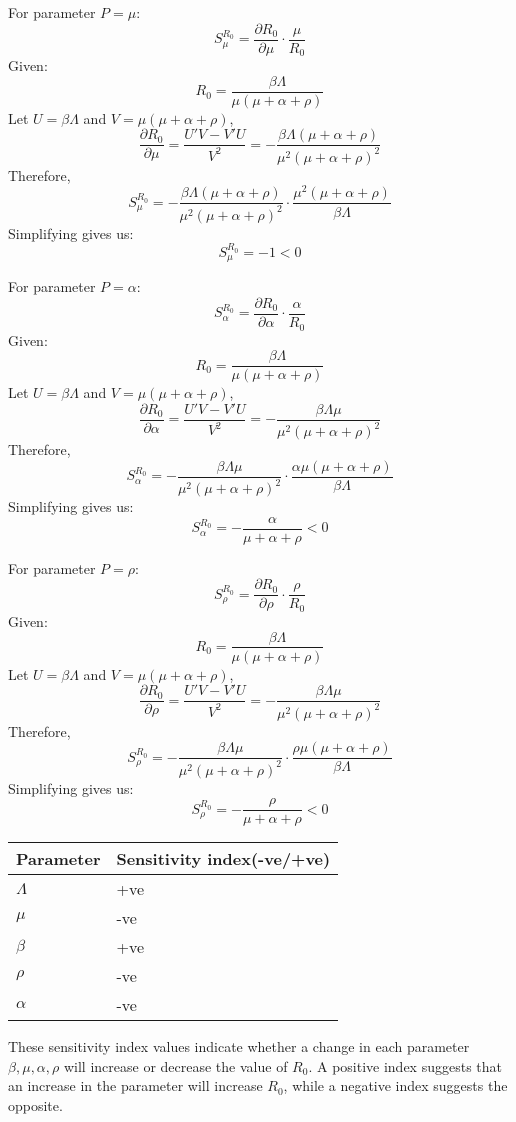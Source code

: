 \documentclass[12pt]{report}
\begin{document}
For parameter \( P = \mu \):
\[ S_{\mu}^{R_0} = \frac{\partial R_0}{\partial \mu} \cdot \frac{\mu}{R_0} \]
Given:
\[ R_0 = \frac{\beta \Lambda}{\mu (\mu + \alpha + \rho)} \]
Let \( U = \beta \Lambda \) and \( V = \mu (\mu + \alpha + \rho) \),
\[ \frac{\partial R_0}{\partial \mu} = \frac{U' V - V' U}{V^2} = -\frac{\beta \Lambda (\mu + \alpha + \rho)}{\mu^2 (\mu + \alpha + \rho)^2} \]
Therefore,
\[ S_{\mu}^{R_0} = -\frac{\beta \Lambda (\mu + \alpha + \rho)}{\mu^2 (\mu + \alpha + \rho)^2} \cdot \frac{\mu^2 (\mu + \alpha + \rho)}{\beta \Lambda} \]
Simplifying gives us:
\[ S_{\mu}^{R_0} = -1 < 0 \]

For parameter \( P = \alpha \):
\[ S_{\alpha}^{R_0} = \frac{\partial R_0}{\partial \alpha} \cdot \frac{\alpha}{R_0} \]
Given:
\[ R_0 = \frac{\beta \Lambda}{\mu (\mu + \alpha + \rho)} \]
Let \( U = \beta \Lambda \) and \( V = \mu (\mu + \alpha + \rho) \),
\[ \frac{\partial R_0}{\partial \alpha} = \frac{U' V - V' U}{V^2} = -\frac{\beta \Lambda \mu}{\mu^2 (\mu + \alpha + \rho)^2} \]
Therefore,
\[ S_{\alpha}^{R_0} = -\frac{\beta \Lambda \mu}{\mu^2 (\mu + \alpha + \rho)^2} \cdot \frac{\alpha \mu (\mu + \alpha + \rho)}{\beta \Lambda} \]
Simplifying gives us:
\[ S_{\alpha}^{R_0} = -\frac{\alpha}{\mu + \alpha + \rho} < 0 \]

For parameter \( P = \rho \):
\[ S_{\rho}^{R_0} = \frac{\partial R_0}{\partial \rho} \cdot \frac{\rho}{R_0} \]
Given:
\[ R_0 = \frac{\beta \Lambda}{\mu (\mu + \alpha + \rho)} \]
Let \( U = \beta \Lambda \) and \( V = \mu (\mu + \alpha + \rho) \),
\[ \frac{\partial R_0}{\partial \rho} = \frac{U' V - V' U}{V^2} = -\frac{\beta \Lambda \mu}{\mu^2 (\mu + \alpha + \rho)^2} \]
Therefore,
\[ S_{\rho}^{R_0} = -\frac{\beta \Lambda \mu}{\mu^2 (\mu + \alpha + \rho)^2} \cdot \frac{\rho \mu (\mu + \alpha + \rho)}{\beta \Lambda} \]
Simplifying gives us:
\[ S_{\rho}^{R_0} = -\frac{\rho}{\mu + \alpha + \rho} < 0 \]
\begin{center}

	\begin{tabular}{|l|l|}
		\hline
		\textbf{Parameter} & \textbf{Sensitivity index(-ve/+ve)} \\
		
	
		\hline$\Lambda$ &  \hspace{1.7cm}+ve \\
		\hline	$\mu$ & \hspace{1.7cm}-ve \\
        \hline	$\beta$ & \hspace{1.7cm}+ve \\
		\hline	$\rho$ & \hspace{1.7cm}-ve \\
		\hline	$\alpha$ & \hspace{1.7cm}-ve \\
		\hline
	\end{tabular}
\end{center}
These sensitivity index values indicate whether a change in each parameter \( \beta, \mu, \alpha, \rho \) will increase or decrease the value of \( R_0 \). A positive index suggests that an increase in the parameter will increase \( R_0 \), while a negative index suggests the opposite.
\end{document}
